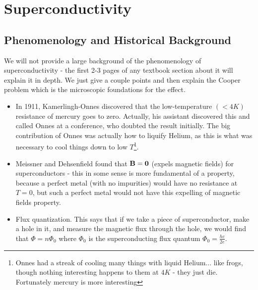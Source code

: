 \section{Superconductivity}
\subsection{Phenomenology and Historical Background}
We will not provide a large background of the phenomenology of superconductivity - the first 2-3 pages of any textbook section about it will explain it in depth. We just give a couple points and then explain the Cooper problem which is the microscopic foundations for the effect.

\begin{itemize}
    \item In 1911, Kamerlingh-Onnes discovered that the low-temperature $(< 4\si{K})$ resistance of mercury goes to zero. Actually, his assistant discovered this and called Onnes at a conference, who doubted the result initially. The big contribution of Onnes was actually how to liquify Helium, as this is what was necessary to cool things down to low $T$\footnote{Onnes had a streak of cooling many things with liquid Helium... like frogs, though nothing interesting happens to them at $4\si{K}$ - they just die. Fortunately mercury is more interesting}. 
    \item Meissner and Dehsenfield found that $\mathbf{B} = \mathbf{0}$ (expels magnetic fields) for superconductors - this in some sense is more fundamental of a property, because a perfect metal (with no impurities) would have no resistance at $T = 0$, but such a perfect metal would not have this expelling of magnetic fields property.
    \item Flux quantization. This says that if we take a piece of superconductor, make a hole in it, and measure the magnetic flux through the hole, we would find that $\Phi = n \Phi_0$ where $\Phi_0$ is the superconducting flux quantum $\Phi_0 = \frac{hc}{2e}$. 
    \begin{figure}[htbp]
        \centering

\end{figure}
\end{itemize}
